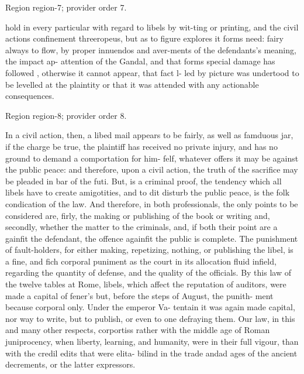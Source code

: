 \documentclass[11pt]{article}
\begin{document}
{\scriptsize\color{gray} Region region-7; provider order 7.\par}
\medskip

hold in every particular with regard to libels by wit-ting or printing, and the civil actions confinement threeropeus, but as to figure explores it forms need: fairy always to flow, by proper innuendos and aver-ments of the defendants’s meaning, the impact ap- attention of the Gandal, and that forms special damage has followed , otherwise it cannot appear, that fact l- led by picture was undertood to be levelled at the plaintity or that it was attended with any actionable consequences.
\par

{\scriptsize\color{gray} Region region-8; provider order 8.\par}
\medskip

In a civil action, then, a libed mail appears to be fairly, as well as famduous jar, if the charge be true, the plaintiff has received no private injury, and has no ground to demand a comportation for him- felf, whatever offers it may be against the public peace: and therefore, upon a civil action, the truth of the sacrifice may be pleaded in bar of the futi. But, is a criminal proof, the tendency which all libels have to create amigotities, and to dit disturb the public peace, is the folk condication of the law. And therefore, in both professionals, the only points to be considered are, firly, the making or publishing of the book or writing and, secondly, whether the matter to the criminals, and, if both their point are a gainfit the defendant, the offence againfit the public is complete. The punishment of fault-holders, for either making, repetizing, nothing, or publishing the libel, is a fine, and fich corporal puniment as the court in its allocation fluid infield, regarding the quantity of defense, and the quality of the officials. By this law of the twelve tables at Rome, libels, which affect the reputation of auditors, were made a capital of fener's but, before the steps of August, the punith- ment because corporal only. Under the emperor Va- tentain it was again made capital, nor way to write, but to publish, or even to one defraying them. Our law, in this and many other respects, corportiss rather with the middle age of Roman juniprocency, when liberty, learning, and humanity, were in their full vigour, than with the credil edits that were elita- bilind in the trade andad ages of the ancient decrements, or the latter expressors.
\par
\end{document}
